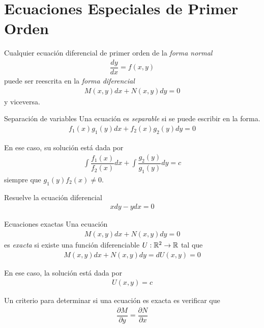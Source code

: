 \section{Ecuaciones Especiales de Primer Orden}

{}
  Cualquier ecuación diferencial de primer orden de la \emph{forma normal}
     \begin{align}
   \dfrac{dy}{dx} = f(x,y)
   \end{align}
   puede ser reescrita en la \emph{forma diferencial}
       \begin{align}
    M(x,y)dx+N(x,y)dy =0
    \end{align} 
    y  viceversa. 

{Separación de variables}
Una ecuación es \emph{separable} si se puede escribir en la forma. 
 \begin{align}
 f_{1}(x)g_{1}(y)dx+f_{2}(x)g_{2}(y)dy = 0
 \end{align}
 
{}
En ese caso, su solución  está dada por
   \begin{align}
       \displaystyle \int \dfrac{f_{1}(x)}{f_{2}(x)}dx
       + \int \dfrac{g_{2}(y)}{g_{1}(y)}dy = c
  \end{align}
  siempre que $g_{1}(y)f_{2}(x)\neq 0$.


	\begin{problema}
		Resuelve la ecuación diferencial
		\begin{align*}
		xdy-ydx=0
		\end{align*}
	\end{problema}

{Ecuaciones exactas}
  Una ecuación
     \begin{align}
   M(x,y)dx + N(x,y)dy = 0
   \end{align}
   es \emph{exacta} si 
   existe una función diferenciable $U:\mathbb{R}^{2}\to \mathbb{R}$ tal que
       \begin{align}
       M(x,y)dx + N(x,y)dy = dU(x,y) = 0 
    \end{align}
 

En ese caso, la solución está dada por                                         \begin{align}
U(x,y) = c
\end{align}

{}
Un criterio para determinar si una ecuación es exacta es verificar que 
\begin{align}
    \dfrac{\partial M}{\partial y}= \dfrac{\partial N}{\partial x}
    \end{align}

